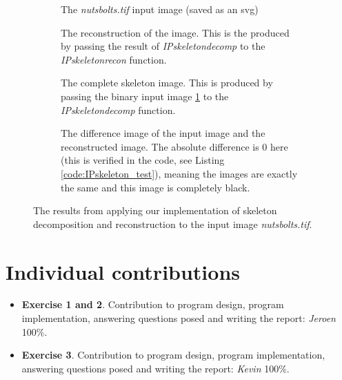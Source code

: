 \documentclass{article}
\begin{document}
\begin{figure}[H]
     \centering
     \begin{subfigure}[t]{0.4\textwidth}
         \centering
         
         \caption{The \textit{nutsbolts.tif} input image (saved as an svg)}
         \label{fig:skeleton_input}
     \end{subfigure}
     \hfill
     \begin{subfigure}[t]{0.4\textwidth}
         \centering
         
         \caption{The reconstruction of the image. This is the produced by passing the result of \textit{IPskeletondecomp} to the \textit{IPskeletonrecon} function.}
         \label{fig:skeleton_reconstruction}
     \end{subfigure}
     \newline
     \begin{subfigure}[t]{0.4\textwidth}
         \centering
         
         \caption{The complete skeleton image. This is produced by passing the binary input image \ref{fig:skeleton_input} to the \textit{IPskeletondecomp} function.}
         \label{fig:skeleton_skeleton}
     \end{subfigure}
     \hfill
     \begin{subfigure}[t]{0.4\textwidth}
         \centering
         
         \caption{The difference image of the input image and the reconstructed image. The absolute difference is 0 here (this is verified in the code, see  Listing \ref{code:IPskeleton_test}), meaning the images are exactly the same and this image is completely black.}
         \label{fig:skeleton_difference}
     \end{subfigure}
    \caption{The results from applying our implementation of skeleton decomposition and reconstruction to the input image \textit{nutsbolts.tif}.}
    \label{fig:skeleton_results}
\end{figure}

\section*{Individual contributions}
\begin{itemize}
    \item \textbf{Exercise 1 and 2}. Contribution to program design, program implementation, answering questions posed and writing the report: \textit{Jeroen} 100\%.
    \item \textbf{Exercise 3}. Contribution to program design, program implementation, answering questions posed and writing the report: \textit{Kevin} 100\%.
\end{itemize}
\end{document}
